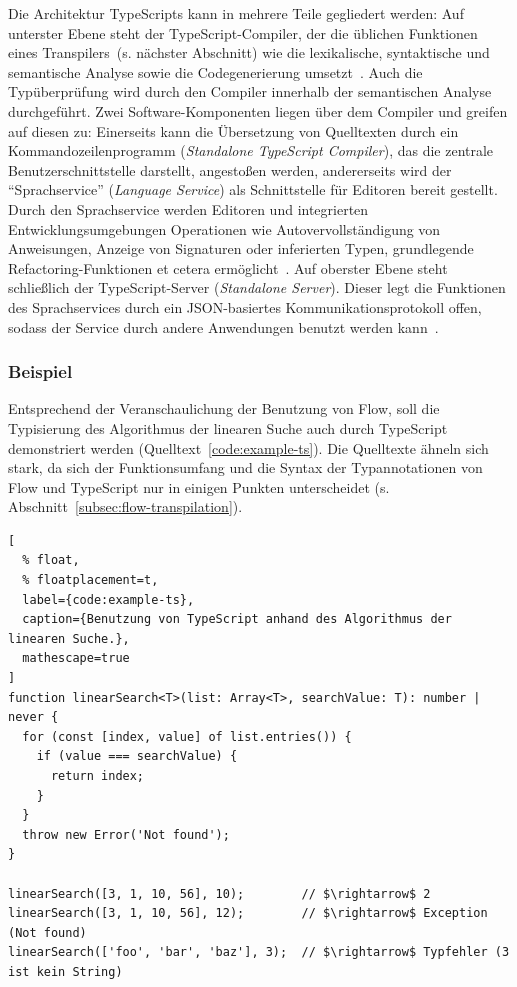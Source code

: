Die Architektur TypeScripts kann in mehrere Teile gegliedert werden: Auf unterster Ebene steht der TypeScript-Compiler, der die üblichen Funktionen eines Transpilers~(s. nächster Abschnitt) wie die lexikalische, syntaktische und semantische Analyse sowie die Codegenerierung umsetzt~\autocite{TYPESCRIPT:ARCHITECTURE}. Auch die Typüberprüfung wird durch den Compiler innerhalb der semantischen Analyse durchgeführt. Zwei Software-Komponenten liegen über dem Compiler und greifen auf diesen zu: Einerseits kann die Übersetzung von Quelltexten durch ein Kommandozeilenprogramm (\textit{Standalone TypeScript Compiler}), das die zentrale Benutzerschnittstelle darstellt, angestoßen werden, andererseits wird der \enquote{Sprachservice} (\textit{Language Service}) als Schnittstelle für Editoren bereit gestellt. Durch den Sprachservice werden Editoren und integrierten Entwicklungsumgebungen Operationen wie Autovervollständigung von Anweisungen, Anzeige von Signaturen oder inferierten Typen, grundlegende Refactoring-Funktionen et cetera ermöglicht~\autocite{TYPESCRIPT:ARCHITECTURE}. Auf oberster Ebene steht schließlich der TypeScript-Server (\textit{Standalone Server}). Dieser legt die Funktionen des Sprachservices durch ein JSON-basiertes Kommunikationsprotokoll offen, sodass der Service durch andere Anwendungen benutzt werden kann~\autocite{TYPESCRIPT:TSSERVER}.

\subsubsection{Beispiel}

Entsprechend der Veranschaulichung der Benutzung von Flow, soll die Typisierung des Algorithmus der linearen Suche auch durch TypeScript demonstriert werden (Quelltext~\ref{code:example-ts}). Die Quelltexte ähneln sich stark, da sich der Funktionsumfang und die Syntax der Typannotationen von Flow und TypeScript nur in einigen Punkten unterscheidet (s. Abschnitt~\ref{subsec:flow-transpilation}).

\begin{lstlisting}[
  % float,
  % floatplacement=t,
  label={code:example-ts},
  caption={Benutzung von TypeScript anhand des Algorithmus der linearen Suche.},
  mathescape=true
]
function linearSearch<T>(list: Array<T>, searchValue: T): number | never {
  for (const [index, value] of list.entries()) {
    if (value === searchValue) {
      return index;
    }
  }
  throw new Error('Not found');
}

linearSearch([3, 1, 10, 56], 10);        // $\rightarrow$ 2
linearSearch([3, 1, 10, 56], 12);        // $\rightarrow$ Exception (Not found)
linearSearch(['foo', 'bar', 'baz'], 3);  // $\rightarrow$ Typfehler (3 ist kein String)
\end{lstlisting}

